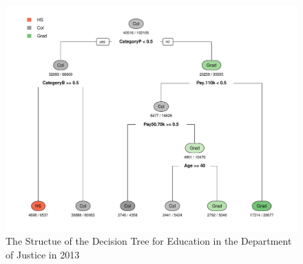 \documentclass{article}
\begin{document}
    \begin{center}
        \begin{figure}
            \includegraphics[scale=0.4]{./images/edu-decision-tree-2013.pdf}
            \caption{The Structue of the Decision Tree for Education in the Department of Justice in 2013}
            \label{edudesctree2013}
        \end{figure}
    \end{center}
\end{document}
